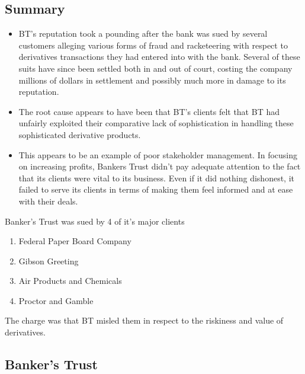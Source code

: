 \documentclass[PRMIA4A.tex]{subfiles}
\begin{document}
\subsection{Summary}
\begin{itemize}
	\item BT’s reputation took a pounding after the bank was sued by several customers alleging various forms of fraud
	and racketeering with respect to derivatives transactions they had entered into with the bank. Several of these
	suits have since been settled both in and out of court, costing the company millions of dollars in settlement and
	possibly much more in damage to its reputation.
	\item The root cause appears to have been that BT’s clients felt that BT had unfairly exploited their comparative lack of
	sophistication in handling these sophisticated derivative products.
	\item This appears to be an example of poor stakeholder management. In focusing on increasing profits, Bankers Trust
	didn’t pay adequate attention to the fact that its clients were vital to its business. Even if it did nothing dishonest,
	it failed to serve its clients in terms of making them feel informed and at ease with their deals.
\end{itemize}


Banker's Trust was sued by 4 of it's major clients

\begin{enumerate}
\item Federal Paper Board Company
\item Gibson Greeting
\item Air Products and Chemicals
\item Proctor and Gamble
\end{enumerate}

The charge was that BT misled them in respect to the riskiness and value of derivatives.




\subsection{Banker's Trust}
\end{document}
